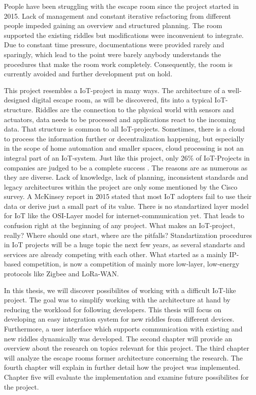 People have been struggling with the escape room since the project started in 2015. 
Lack of management and constant iterative refactoring from different people impeded gaining an overview and structured planning.
The room supported the existing riddles but modifications were inconvenient to integrate.
Due to constant time pressure, 
documentations were provided rarely and sparingly, 
which lead to the point were barely anybody understands 
the procedures that make the room work completely. 
Consequently, the room is currently avoided and further development put on hold.

This project resembles a IoT-project in many ways.
The architecture of a well-designed digital escape room, as will be discovered, fits into a typical IoT-structure.
Riddles are the connection to the physical world with sensors and actuators, data needs to be processed and applications react to the incoming data.
That structure is common to all IoT-projects. 
Sometimes, there is a cloud to process the information further or decentralization happening, 
but especially in the scope of home automation and smaller spaces, cloud processing is not an integral part of an IoT-system. 
Just like this project, only 26\% of IoT-Projects in companies are judged to be a complete success \parencite{ciscoresearch}. 
The reasons are as numerous as they are diverse. 
Lack of knowledge, lack of planning, inconsistent standards and legacy architectures within the project are only some mentioned by the Cisco survey.
A McKinsey report \parencite{mcKinsey} in 2015 stated that most IoT adopters fail to use their data or derive just a small part of its value.
There is no standartized layer model for IoT like the OSI-Layer model for internet-communication yet. That leads to confusion right at the beginning of any project.
What makes an IoT-project, really? Where should one start, where are the pitfalls? 
Standartization procedures in IoT projects will be a huge topic the next few years, as several standarts and services are already competing with each other.
What started as a mainly IP-based competition, is now a competition of mainly more low-layer, low-energy protocols like Zigbee and LoRa-WAN.

In this thesis, we will discover possibilites of working with a difficult IoT-like project.
The goal was to simplify working with the architecture at hand by reducing the workload for following developers. 
This thesis will focus on developing an easy integration system for new riddles from different devices.
Furthermore, a user interface which supports communication with existing and new riddles dynamically was developed.
The second chapter will provide an overview about the research on topics relevant for this project. 
The third chapter will analyze the escape rooms former architecture concerning the research. 
The fourth chapter will explain in further detail how the project was implemented. 
Chapter five will evaluate the implementation and examine future possibilites for the project.





